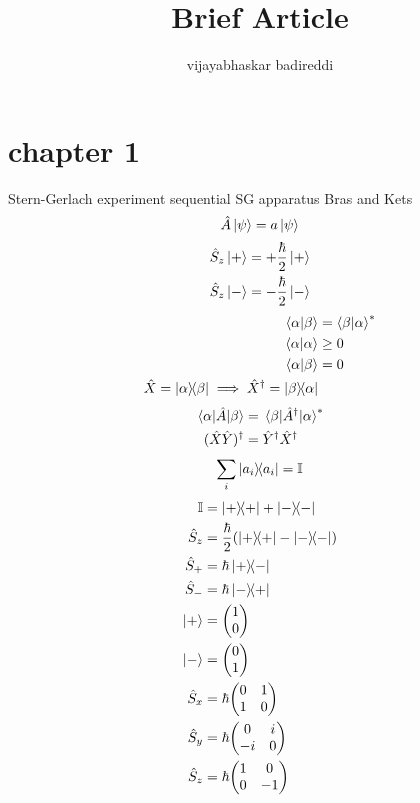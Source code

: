 \documentclass[12pt]{article}
\title{Brief Article}
\author{vijayabhaskar badireddi}
\begin{document}

\section*{chapter 1}
Stern-Gerlach experiment
sequential SG apparatus
Bras and Kets
\begin{equation*}
\hat{A}\ket{\psi}=a \ket{\psi}
\end{equation*}
\begin{align*}
\hat{S}_z \ket{+}&=+\frac{\hbar}{2}\ket{+}\\
\hat{S}_z \ket{-}&=-\frac{\hbar}{2}\ket{-}
\end{align*}
\begin{align*}
\ip{\alpha}{\beta}&=\ip{\beta}{\alpha}^*\\
\ip{\alpha}{\alpha}&\ge 0 \\
\ip{\alpha}{\beta}&=0\\
\hat{X}=\dyad{\alpha}{\beta}\implies \hat{X}^{\dagger}=\dyad{\beta}{\alpha}
\end{align*}
\begin{align*}
\mel{\alpha}{\hat{A}}{\beta}&=\mel{\beta}{\hat{A}^{\dagger}}{\alpha}^*\\
(\hat{X}\hat{Y})^{\dagger}&=\hat{Y}^{\dagger}\hat{X}^{\dagger}
\end{align*}
\begin{align*}
\sum_i \dyad{a_i}{a_i}=\mathbb{I}
\end{align*}
\begin{align*}
\mathbb{I}&=\dyad{+}{+}+\dyad{-}{-}\\
\hat{S}_z&=\frac{\hbar}{2}(\dyad{+}{+}-\dyad{-}{-})\\
\hat{S}_+&=\hbar \dyad{+}{-}\\
\hat{S}_-&=\hbar \dyad{-}{+}\\
\ket{+}&=\mqty(1 \\ 0)\\
\ket{-}&=\mqty(0 \\ 1)\\
\hat{S}_x&=\hbar \mqty(0 & 1 \\1 & 0)\\
\hat{S}_y&=\hbar \mqty(0 & i \\-i & 0)\\
\hat{S}_z&=\hbar \mqty(1 & 0 \\0 & -1)\\
\end{align*}
\end{document}

